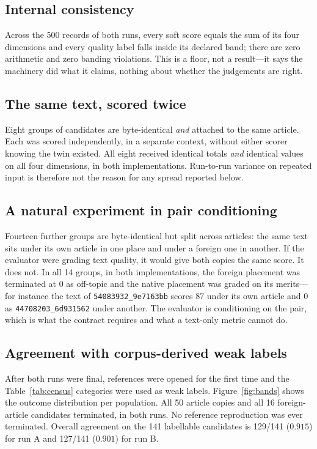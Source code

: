 \documentclass[conference]{IEEEtran}
\begin{document}
\subsection{Internal consistency}
Across the 500 records of both runs, every soft score equals the sum of
its four dimensions and every quality label falls inside its declared
band; there are zero arithmetic and zero banding violations. This is a
floor, not a result---it says the machinery did what it claims, nothing
about whether the judgements are right.

\subsection{The same text, scored twice}
Eight groups of candidates are byte-identical \emph{and} attached to the
same article. Each was scored independently, in a separate context,
without either scorer knowing the twin existed. All eight received
identical totals \emph{and} identical values on all four dimensions, in
both implementations. Run-to-run variance on repeated input is
therefore not the reason for any spread reported below.

\subsection{A natural experiment in pair conditioning}
Fourteen further groups are byte-identical but split across articles:
the same text sits under its own article in one place and under a
foreign one in another. If the evaluator were grading text quality, it
would give both copies the same score. It does not. In all 14 groups,
in both implementations, the foreign placement was terminated at 0 as
off-topic and the native placement was graded on its merits---for
instance the text of \texttt{54083932\_9e7163bb} scores 87 under its own
article and 0 as \texttt{44708203\_6d931562} under another. The
evaluator is conditioning on the pair, which is what the contract
requires and what a text-only metric cannot do.

\subsection{Agreement with corpus-derived weak labels}
After both runs were final, references were opened for the first time
and the Table~\ref{tab:census} categories were used as weak labels.
Figure~\ref{fig:bands} shows the outcome distribution per population.
All 50 article copies and all 16 foreign-article candidates terminated,
in both runs. No reference reproduction was ever terminated. Overall
agreement on the 141 labellable candidates is 129/141 ($0.915$) for run
A and 127/141 ($0.901$) for run B.
\end{document}
